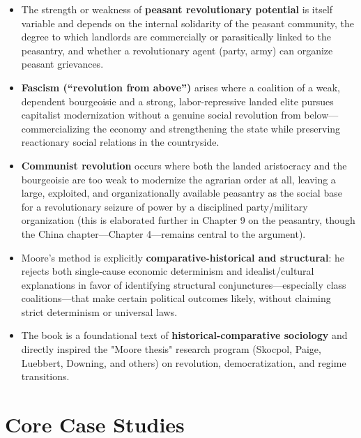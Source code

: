 \documentclass[12pt]{article}
\begin{document}
\begin{itemize}[leftmargin=*, itemsep=4pt]
    \item The strength or weakness of \textbf{peasant revolutionary potential} is itself variable and depends on the internal solidarity of the peasant community, the degree to which landlords are commercially or parasitically linked to the peasantry, and whether a revolutionary agent (party, army) can organize peasant grievances.
    \item \textbf{Fascism (``revolution from above'')} arises where a coalition of a weak, dependent bourgeoisie and a strong, labor-repressive landed elite pursues capitalist modernization without a genuine social revolution from below---commercializing the economy and strengthening the state while preserving reactionary social relations in the countryside.
    \item \textbf{Communist revolution} occurs where both the landed aristocracy and the bourgeoisie are too weak to modernize the agrarian order at all, leaving a large, exploited, and organizationally available peasantry as the social base for a revolutionary seizure of power by a disciplined party/military organization (this is elaborated further in Chapter 9 on the peasantry, though the China chapter---Chapter 4---remains central to the argument).
    \item Moore's method is explicitly \textbf{comparative-historical and structural}: he rejects both single-cause economic determinism and idealist/cultural explanations in favor of identifying structural conjunctures---especially class coalitions---that make certain political outcomes likely, without claiming strict determinism or universal laws.
    \item The book is a foundational text of \textbf{historical-comparative sociology} and directly inspired the "Moore thesis" research program (Skocpol, Paige, Luebbert, Downing, and others) on revolution, democratization, and regime transitions.
\end{itemize}

\section{Core Case Studies}
\end{document}
